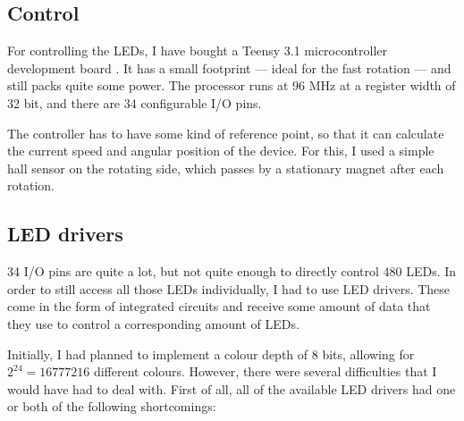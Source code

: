 \documentclass[a4paper, 11pt, titlepage]{report}
\begin{document}
\subsection{Control}

For controlling the LEDs, I have bought a Teensy 3.1 microcontroller development board
\cite{teensy}. It has a small footprint --- ideal for the fast rotation --- and still packs quite
some power. The processor runs at 96 MHz at a register width of 32 bit, and there are 34
configurable I/O pins.

The controller has to have some kind of reference point, so that it can calculate the current
speed and angular position of the device. For this, I used a simple hall sensor on the rotating
side, which passes by a stationary magnet after each rotation.



\subsection{LED drivers}

34 I/O pins are quite a lot, but not quite enough to directly control 480 LEDs. In order to still
access all those LEDs individually, I had to use LED drivers. These come in the form of integrated
circuits and receive some amount of data that they use to control a corresponding amount of LEDs.

Initially, I had planned to implement a colour depth of 8 bits, allowing for
$2^{24} = 16777216$ different colours. However, there were several difficulties that I would have
had to deal with. First of all, all of the available LED drivers had one or both of the following
shortcomings:
\end{document}
